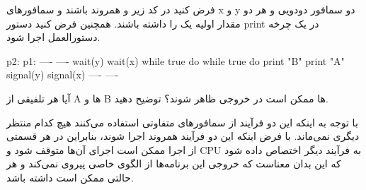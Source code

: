 \documentclass[]{article}
\begin{document}
فرض کنید در کد زیر
 و 
همروند باشند و سمافورهای x و y دو سمافور دودویی و هر دو مقدار اولیه یک را داشته باشند. همچنین
فرض کنید دستور print در یک چرخه دستورالعمل اجرا شود.
\begin{latin}
    \begin{center}
        \begin{spverbatim}
            p2:                         p1:
                ----                        ----
                wait(y)                     wait(x)
                while true do               while true do
                    print "B"                   print "A"
                signal(y)                   signal(x)
                ----                        ----
        \end{spverbatim}
    \end{center}
\end{latin}

آیا هر تلفیقی از A ها و B ها ممکن است در خروجی ظاهر شوند؟ توضیح دهید.

با توجه به اینکه این دو فرآیند از سمافور‌های متفاوتی استفاده می‌کنند هیچ کدام منتظر دیگری نمی‌ماند.
با فرض اینکه این دو فرآیند همروند اجرا شوند، بنابراین در هر قسمتی از اجرا ممکن است اجرای آن‌ها متوقف شود
و CPU به فرآیند دیگر اختصاص داده شود که این بدان معناست که
خروجی این برنامه‌ها از الگوی خاصی پیروی نمی‌کند و هر حالتی ممکن است داشته باشد.
\end{document}
